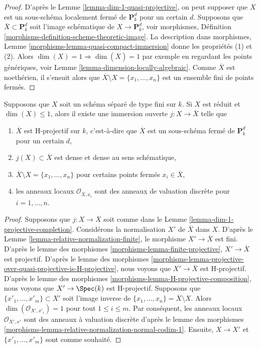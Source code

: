 \begin{proof}
D'après le Lemme \ref{lemma-dim-1-quasi-projective},
on peut supposer que $X$ est un sous-schéma localement
fermé de $\mathbf{P}^d_k$ pour un certain $d$.
Supposons que $\overline{X} \subset \mathbf{P}^d_k$
soit l'image schématique de $X \to \mathbf{P}^d_k$,
voir morphismes, Définition
\ref{morphisms-definition-scheme-theoretic-image}. La
description dans morphismes, Lemme
\ref{morphisms-lemma-quasi-compact-immersion} donne les
propriétés (1) et (2). Alors $\dim(X) = 1 \Rightarrow
\dim(\overline{X}) = 1$ par exemple en regardant les points
génériques, voir Lemme \ref{lemma-dimension-locally-algebraic}. Comme
$\overline{X}$ est noethérien, il s'ensuit alors que $\overline{X}
\setminus X = \{x_1, \ldots, x_n\}$ est un ensemble fini de points fermés.
\end{proof}

\begin{lemma}
\label{lemma-reduced-dim-1-projective-completion}
Supposons que $X$ soit un schéma séparé de type fini sur
$k$. Si $X$ est réduit et $\dim(X) \leq 1$, alors il
existe une immersion ouverte $j : X \to \overline{X}$ telle que
\begin{enumerate}
\item $\overline{X}$ est H-projectif sur $k$,
c'est-à-dire que $\overline{X}$ est un sous-schéma fermé
de $\mathbf{P}^d_k$ pour un certain $d$, \item $j(X)
\subset \overline{X}$ est dense et dense au sens
schématique, \item $\overline{X} \setminus X = \{x_1, \ldots,
x_n\}$ pour certains points fermés $x_i \in \overline{X}$,
\item les anneaux locaux $\mathcal{O}_{\overline{X}, x_i}$
sont des anneaux de valuation discrète pour $i = 1, \ldots, n$.
\end{enumerate}
\end{lemma}

\begin{proof}
Supposons que $j : X \to \overline{X}$ soit comme dans le
Lemme \ref{lemma-dim-1-projective-completion}. Considérons
la normalisation $X'$ de $\overline{X}$ dans $X$. D'après
le Lemme \ref{lemma-relative-normalization-finite}, le
morphisme $X' \to \overline{X}$ est fini. D'après le lemme
des morphismes \ref{morphisms-lemma-finite-projective}, $X'
\to \overline{X}$ est projectif. D'après le lemme des
morphismes
\ref{morphisms-lemma-projective-over-quasi-projective-is-H-projective},
nous voyons que $X' \to \overline{X}$ est H-projectif. D'après
le lemme des morphismes
\ref{morphisms-lemma-H-projective-composition}, nous voyons que $X'
\to \Spec(k)$ est H-projectif. Supposons que $\{x'_1, \ldots, x'_m\}
\subset X'$ soit l'image inverse de $\{x_1, \ldots, x_n\} =
\overline{X} \setminus X$. Alors $\dim(\mathcal{O}_{X', x'_i}) = 1$
pour tout $1 \leq i \leq m$. Par conséquent, les anneaux locaux
$\mathcal{O}_{X', x'}$ sont des anneaux à valuation discrète d'après le
lemme des morphismes
\ref{morphisms-lemma-relative-normalization-normal-codim-1}. Ensuite, $X \to X'$ et $\{x'_1, \ldots, x'_m\}$ sont comme souhaité.
\end{proof}

